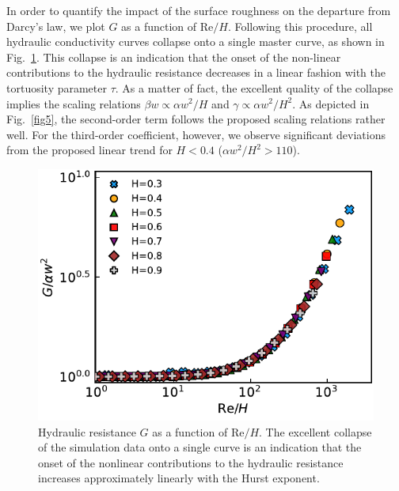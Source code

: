 \documentclass[aps,pre,
superscriptaddress,
twocolumn,
notitlepage,
10pt,
]{revtex4-1}
\begin{document}
In order to quantify the impact of the surface roughness on the departure from
Darcy's law, we plot $G$  as a function of $ \mathrm{Re}/H $. Following this
procedure, all hydraulic conductivity curves collapse onto a single master
curve, as shown in Fig.~\ref{fig4}. This collapse is an indication that the
onset of the non-linear contributions to the hydraulic resistance decreases in a
linear fashion with the tortuosity parameter $\tau$. As a matter of fact, the
excellent quality of the collapse implies the scaling relations $ \beta w
\propto \alpha w^2/H $ and $ \gamma \propto \alpha w^2/H^2 $. As depicted in
Fig.~\ref{fig5}, the second-order term follows the proposed scaling
relations rather well. For the third-order coefficient, however, we observe significant deviations
from the proposed linear trend for $H<0.4$ ($\alpha w^2/H^2 > 110$).
\begin{figure} [!h] %
	\centering %
	\includegraphics[width=0.99\columnwidth]{fig4.pdf} \caption{Hydraulic
		resistance
		$G$ as a function of $\mathrm{Re}/H$. The excellent collapse of the
		simulation
		data onto a single curve is an indication that the onset of the nonlinear
		contributions to the hydraulic resistance increases approximately linearly
		with
		the Hurst exponent.} \label{fig4} %
\end{figure} %
\end{document}
